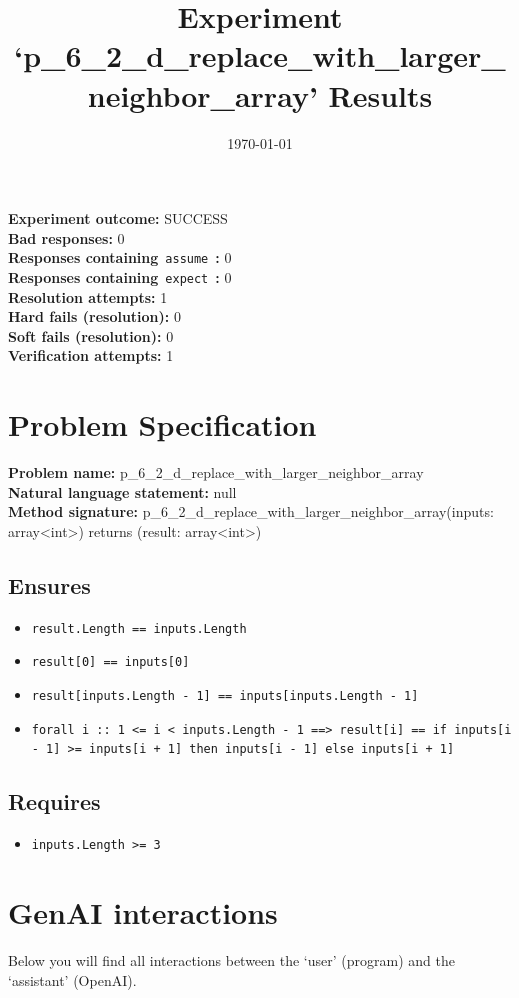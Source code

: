 \documentclass{article}
\begin{document}
\title{Experiment `p\_6\_2\_d\_replace\_with\_larger\_neighbor\_array' Results}
\author{\today}
\date{}
\maketitle
\textbf{Experiment outcome: }SUCCESS
\\\textbf{Bad responses: }0
\\\textbf{Responses containing}~\texttt{assume}~\textbf{: }0
\\\textbf{Responses containing}~\texttt{expect}~\textbf{: }0
\\\textbf{Resolution attempts: }1
\\\textbf{Hard fails (resolution): }0
\\\textbf{Soft fails (resolution): }0
\\\textbf{Verification attempts: }1
\section*{Problem Specification}
\textbf{Problem name: }p\_6\_2\_d\_replace\_with\_larger\_neighbor\_array
\\\textbf{Natural language statement: }null
\\\textbf{Method signature: }p\_6\_2\_d\_replace\_with\_larger\_neighbor\_array(inputs: array<int>) returns (result: array<int>)
\subsection*{Ensures}
\begin{itemize}
\item \texttt{result.Length == inputs.Length}
\item \texttt{result[0] == inputs[0]}
\item \texttt{result[inputs.Length - 1] == inputs[inputs.Length - 1]}
\item \texttt{forall i :: 1 <= i < inputs.Length - 1 ==> result[i] == if inputs[i - 1] >= inputs[i + 1] then inputs[i - 1] else inputs[i + 1]}
\end{itemize}
\subsection*{Requires}
\begin{itemize}
\item \texttt{inputs.Length >= 3}
\end{itemize}
\clearpage
\section*{GenAI interactions}
Below you will find all interactions between the `user' (program) and the `assistant' (OpenAI).
\end{document}
